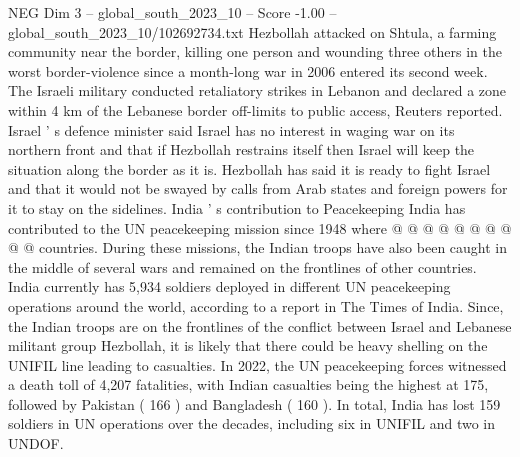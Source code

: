 \begin{textsample}{NEG Dim 3 – global\_south\_2023\_10 – Score -1.00 – global\_south\_2023\_10/102692734.txt}
Hezbollah attacked on Shtula, a farming community near the border, killing one person and wounding three others in the worst border-violence since a month-long war in 2006 entered its second week.
The Israeli military conducted retaliatory strikes in Lebanon and declared a zone within 4 km of the Lebanese border off-limits to public access, Reuters reported.
Israel ' s defence minister said Israel has no interest in waging war on its northern front and that if Hezbollah restrains itself then Israel will keep the situation along the border as it is.
Hezbollah has said it is ready to fight Israel and that it would not be swayed by calls from Arab states and foreign powers for it to stay on the sidelines.
India ' s contribution to Peacekeeping India has contributed to the UN peacekeeping mission since 1948 where @ @ @ @ @ @ @ @ @ @ countries.
During these missions, the Indian troops have also been caught in the middle of several wars and remained on the frontlines of other countries.
India currently has 5,934 soldiers deployed in different UN peacekeeping operations around the world, according to a report in The Times of India.
Since, the Indian troops are on the frontlines of the conflict between Israel and Lebanese militant group Hezbollah, it is likely that there could be heavy shelling on the UNIFIL line leading to casualties.
In 2022, the UN peacekeeping forces witnessed a death toll of 4,207 fatalities, with Indian casualties being the highest at 175, followed by Pakistan ( 166 ) and Bangladesh ( 160 ).
In total, India has lost 159 soldiers in UN operations over the decades, including six in UNIFIL and two in UNDOF.

\end{textsample}
